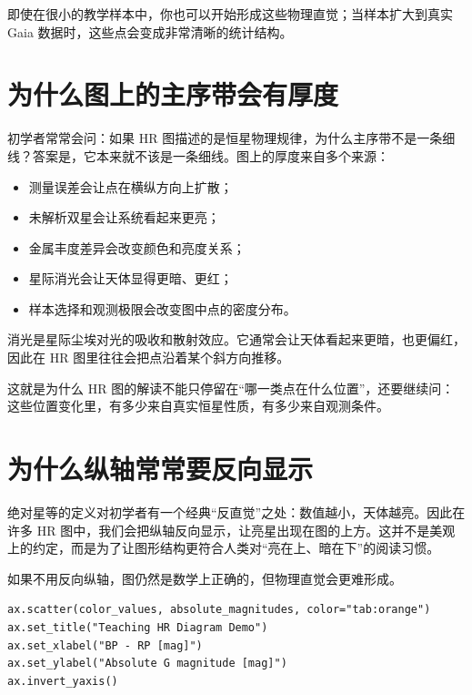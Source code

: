 即使在很小的教学样本中，你也可以开始形成这些物理直觉；当样本扩大到真实 Gaia 数据时，这些点会变成非常清晰的统计结构。

\section{为什么图上的主序带会有厚度}

初学者常常会问：如果 HR 图描述的是恒星物理规律，为什么主序带不是一条细线？答案是，它本来就不该是一条细线。图上的厚度来自多个来源：

\begin{itemize}
    \item 测量误差会让点在横纵方向上扩散；
    \item 未解析双星会让系统看起来更亮；
    \item 金属丰度差异会改变颜色和亮度关系；
    \item 星际消光会让天体显得更暗、更红；
    \item 样本选择和观测极限会改变图中点的密度分布。
\end{itemize}

\begin{defbox}[消光]
消光是星际尘埃对光的吸收和散射效应。它通常会让天体看起来更暗，也更偏红，因此在 HR 图里往往会把点沿着某个斜方向推移。
\end{defbox}

这就是为什么 HR 图的解读不能只停留在“哪一类点在什么位置”，还要继续问：这些位置变化里，有多少来自真实恒星性质，有多少来自观测条件。

\section{为什么纵轴常常要反向显示}

绝对星等的定义对初学者有一个经典“反直觉”之处：数值越小，天体越亮。因此在许多 HR 图中，我们会把纵轴反向显示，让亮星出现在图的上方。这并不是美观上的约定，而是为了让图形结构更符合人类对“亮在上、暗在下”的阅读习惯。

如果不用反向纵轴，图仍然是数学上正确的，但物理直觉会更难形成。

\begin{examplebox}
\begin{lstlisting}[style=pythonstyle]
ax.scatter(color_values, absolute_magnitudes, color="tab:orange")
ax.set_title("Teaching HR Diagram Demo")
ax.set_xlabel("BP - RP [mag]")
ax.set_ylabel("Absolute G magnitude [mag]")
ax.invert_yaxis()
\end{lstlisting}
\end{examplebox}

